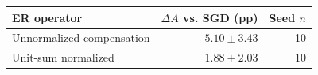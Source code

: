 \begin{tabular}{lrr}
\toprule
ER operator & $\Delta A$ vs. SGD (pp) & Seed $n$ \\
\midrule
Unnormalized compensation & $5.10\pm3.43$ & 10 \\
Unit-sum normalized & $1.88\pm2.03$ & 10 \\
\bottomrule
\end{tabular}
